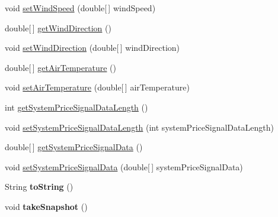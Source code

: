 \begin{DoxyCompactItemize}
\item 
void \hyperlink{classuk_1_1ac_1_1dmu_1_1iesd_1_1cascade_1_1context_1_1_cascade_context_a320906924e950fa0eba6cd29a0c4c081}{set\-Wind\-Speed} (double\mbox{[}$\,$\mbox{]} wind\-Speed)
\item 
double\mbox{[}$\,$\mbox{]} \hyperlink{classuk_1_1ac_1_1dmu_1_1iesd_1_1cascade_1_1context_1_1_cascade_context_a3be7b776e13c501d842d397535658e88}{get\-Wind\-Direction} ()
\item 
void \hyperlink{classuk_1_1ac_1_1dmu_1_1iesd_1_1cascade_1_1context_1_1_cascade_context_acae259222fef0689143913e679d61e1a}{set\-Wind\-Direction} (double\mbox{[}$\,$\mbox{]} wind\-Direction)
\item 
double\mbox{[}$\,$\mbox{]} \hyperlink{classuk_1_1ac_1_1dmu_1_1iesd_1_1cascade_1_1context_1_1_cascade_context_a80f0e88e984a7d78fac8e1e878368e44}{get\-Air\-Temperature} ()
\item 
void \hyperlink{classuk_1_1ac_1_1dmu_1_1iesd_1_1cascade_1_1context_1_1_cascade_context_a1093015944627c2d2461aadf1b8c6343}{set\-Air\-Temperature} (double\mbox{[}$\,$\mbox{]} air\-Temperature)
\item 
int \hyperlink{classuk_1_1ac_1_1dmu_1_1iesd_1_1cascade_1_1context_1_1_cascade_context_a3f83d363662acef41321bc0b599820c2}{get\-System\-Price\-Signal\-Data\-Length} ()
\item 
void \hyperlink{classuk_1_1ac_1_1dmu_1_1iesd_1_1cascade_1_1context_1_1_cascade_context_a8ce210f8f918ae89c864aae3b6fa1e61}{set\-System\-Price\-Signal\-Data\-Length} (int system\-Price\-Signal\-Data\-Length)
\item 
double\mbox{[}$\,$\mbox{]} \hyperlink{classuk_1_1ac_1_1dmu_1_1iesd_1_1cascade_1_1context_1_1_cascade_context_a175f32bb9e44b51a4716a69d5cc134b8}{get\-System\-Price\-Signal\-Data} ()
\item 
void \hyperlink{classuk_1_1ac_1_1dmu_1_1iesd_1_1cascade_1_1context_1_1_cascade_context_a4941e4c60eba41f9527c203116d5c8fb}{set\-System\-Price\-Signal\-Data} (double\mbox{[}$\,$\mbox{]} system\-Price\-Signal\-Data)
\item 
\hypertarget{classuk_1_1ac_1_1dmu_1_1iesd_1_1cascade_1_1context_1_1_cascade_context_aa0391bdfd8658b4933e7bb0f1d289788}{String {\bfseries to\-String} ()}\label{classuk_1_1ac_1_1dmu_1_1iesd_1_1cascade_1_1context_1_1_cascade_context_aa0391bdfd8658b4933e7bb0f1d289788}

\item 
\hypertarget{classuk_1_1ac_1_1dmu_1_1iesd_1_1cascade_1_1context_1_1_cascade_context_ad948d2eaf5846e9640c5dbda6630ae63}{void {\bfseries take\-Snapshot} ()}\label{classuk_1_1ac_1_1dmu_1_1iesd_1_1cascade_1_1context_1_1_cascade_context_ad948d2eaf5846e9640c5dbda6630ae63}


\end{DoxyCompactItemize}
